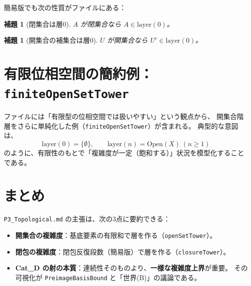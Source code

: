 \documentclass[a4paper,11pt]{article}
\newtheorem{lemma}[definition]{補題}
\begin{document}
簡易版でも次の性質がファイルにある：
\begin{lemma}[閉集合は層0]
$A$ が閉集合なら $A\in \mathrm{layer}(0)$。
\end{lemma}
\begin{lemma}[開集合の補集合は層0]
$U$ が開集合なら $U^{c}\in \mathrm{layer}(0)$。
\end{lemma}

\section{有限位相空間の簡約例：\texttt{finiteOpenSetTower}}
ファイルには「有限型の位相空間では扱いやすい」という観点から、
開集合階層をさらに単純化した例（\texttt{finiteOpenSetTower}）が含まれる。
典型的な意図は、
\[
\mathrm{layer}(0)=\{\emptyset\},\qquad \mathrm{layer}(n)=\mathrm{Open}(X)\ (n\ge 1)
\]
のように、有限性のもとで「複雑度が一定（飽和する）」状況を模型化することである。

\section{まとめ}
\texttt{P3\_Topological.md} の主張は、次の3点に要約できる：
\begin{itemize}
  \item \textbf{開集合の複雑度}：基底要素の有限和で層を作る（\texttt{openSetTower}）。
  \item \textbf{閉包の複雑度}：閉包反復段数（簡易版）で層を作る（\texttt{closureTower}）。
  \item \textbf{Cat\_D の射の本質}：連続性そのものより、\textbf{一様な複雑度上界}が重要。
        その可視化が \texttt{PreimageBasisBound} と「世界(B)」の議論である。
\end{itemize}
\end{document}
